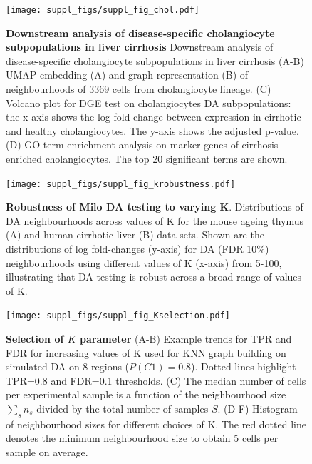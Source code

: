 \documentclass[
]{article}
\begin{document}
\begin{figure}
\centering
\texttt{[image: suppl\_figs/suppl\_fig\_chol.pdf]}
\caption{\label{fig:sup-fig-liver-chol}\textbf{Downstream analysis of disease-specific cholangiocyte subpopulations in liver cirrhosis}
Downstream analysis of disease-specific cholangiocyte subpopulations in liver cirrhosis
(A-B) UMAP embedding (A) and graph representation (B) of neighbourhoods of 3369 cells from cholangiocyte lineage.
(C) Volcano plot for DGE test on cholangiocytes DA subpopulations: the x-axis shows the log-fold change between expression in cirrhotic and healthy cholangiocytes. The y-axis shows the adjusted p-value.
(D) GO term enrichment analysis on marker genes of cirrhosis-enriched cholangiocytes. The top 20 significant terms are shown.}
\end{figure}







\begin{figure}
\centering
\texttt{[image: suppl\_figs/suppl\_fig\_krobustness.pdf]}
\caption{\label{fig:sup-fig-robustness}\textbf{Robustness of Milo DA testing to varying K}. Distributions of DA neighbourhoods across values of K for the mouse ageing thymus (A) and human cirrhotic liver (B) data sets. Shown are the distributions of log fold-changes (y-axis) for DA (FDR 10\%) neighbourhoods using different values of K (x-axis) from 5-100, illustrating that DA testing is robust across a broad range of values of K.}
\end{figure}



\begin{figure}
\centering
\texttt{[image: suppl\_figs/suppl\_fig\_Kselection.pdf]}
\caption{\label{fig:sup-fig-Kselection}\textbf{Selection of \(K\) parameter}
(A-B) Example trends for TPR and FDR for increasing values of K used for KNN graph building on simulated DA on 8 regions (\(P(C1) = 0.8\)). Dotted lines highlight TPR=0.8 and FDR=0.1 thresholds. (C) The median number of cells per experimental sample is a function of the neighbourhood size \(\sum_s{n_s}\) divided by the total number of samples \(S\). (D-F) Histogram of neighbourhood sizes for different choices of K. The red dotted line denotes the minimum neighbourhood size to obtain 5 cells per sample on average.}
\end{figure}




\newpage
\end{document}
